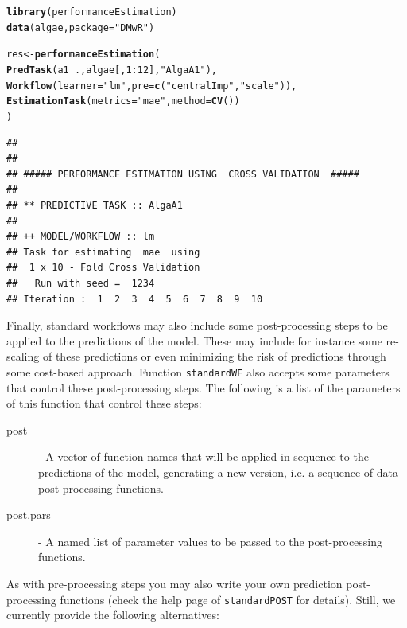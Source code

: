 \documentclass[10pt,a4paper]{article}\usepackage[]{graphicx}\usepackage[]{color}
\makeatletter
\newcommand{\hlnum}[1]{\textcolor[rgb]{0.686,0.059,0.569}{#1}}%
\newcommand{\hlstr}[1]{\textcolor[rgb]{0.192,0.494,0.8}{#1}}%
\newcommand{\hlopt}[1]{\textcolor[rgb]{0,0,0}{#1}}%
\newcommand{\hlstd}[1]{\textcolor[rgb]{0.345,0.345,0.345}{#1}}%
\newcommand{\hlkwb}[1]{\textcolor[rgb]{0.69,0.353,0.396}{#1}}%
\newcommand{\hlkwc}[1]{\textcolor[rgb]{0.333,0.667,0.333}{#1}}%
\newcommand{\hlkwd}[1]{\textcolor[rgb]{0.737,0.353,0.396}{\textbf{#1}}}%
\newenvironment{kframe}{%
 \def\at@end@of@kframe{}%
 \ifinner\ifhmode%
  \def\at@end@of@kframe{\end{minipage}}%
  \begin{minipage}{\columnwidth}%
 \fi\fi%
 \def\FrameCommand##1{\hskip\@totalleftmargin \hskip-\fboxsep
 \colorbox{shadecolor}{##1}\hskip-\fboxsep
     \hskip-\linewidth \hskip-\@totalleftmargin \hskip\columnwidth}%
 \MakeFramed {\advance\hsize-\width
   \@totalleftmargin\z@ \linewidth\hsize
   \@setminipage}}%
 {\par\unskip\endMakeFramed%
 \at@end@of@kframe}
\newenvironment{knitrout}{}{} %
\makeatother
\begin{document}
\begin{knitrout}\footnotesize
{}\color{fgcolor}\begin{kframe}
\begin{alltt}
\hlkwd{library}\hlstd{(performanceEstimation)}
\hlkwd{data}\hlstd{(algae,}\hlkwc{package}\hlstd{=}\hlstr{"DMwR"}\hlstd{)}

\hlstd{res} \hlkwb{<-} \hlkwd{performanceEstimation}\hlstd{(}
         \hlkwd{PredTask}\hlstd{(a1} \hlopt{~} \hlstd{.,algae[,}\hlnum{1}\hlopt{:}\hlnum{12}\hlstd{],}\hlstr{"AlgaA1"}\hlstd{),}
         \hlkwd{Workflow}\hlstd{(}\hlkwc{learner}\hlstd{=}\hlstr{"lm"}\hlstd{,}\hlkwc{pre}\hlstd{=}\hlkwd{c}\hlstd{(}\hlstr{"centralImp"}\hlstd{,}\hlstr{"scale"}\hlstd{)),}
         \hlkwd{EstimationTask}\hlstd{(}\hlkwc{metrics}\hlstd{=}\hlstr{"mae"}\hlstd{,}\hlkwc{method}\hlstd{=}\hlkwd{CV}\hlstd{())}
         \hlstd{)}
\end{alltt}
\begin{verbatim}
## 
## 
## ##### PERFORMANCE ESTIMATION USING  CROSS VALIDATION  #####
## 
## ** PREDICTIVE TASK :: AlgaA1
## 
## ++ MODEL/WORKFLOW :: lm 
## Task for estimating  mae  using
##  1 x 10 - Fold Cross Validation
## 	 Run with seed =  1234 
## Iteration :  1  2  3  4  5  6  7  8  9  10
\end{verbatim}
\end{kframe}
\end{knitrout}

Finally, standard workflows may also include some post-processing steps to be applied to the predictions of the model. These may include for instance some re-scaling of these predictions or even minimizing the risk of predictions through some cost-based approach. Function \texttt{standardWF} also accepts some parameters that control these post-processing steps. The following is a list of the parameters of this function that control these steps:

\begin{description}
\item[post] - A vector of function names that will be applied in sequence to the
  predictions of the model, generating a new version, i.e. a sequence of data
  post-processing functions.

\item[post.pars] - A named list of parameter values to be passed to the post-processing functions.
\end{description}

As with pre-processing steps you may also write your own prediction post-processing functions (check the help page of \texttt{standardPOST} for details). Still, we currently provide the following alternatives:
\end{document}
